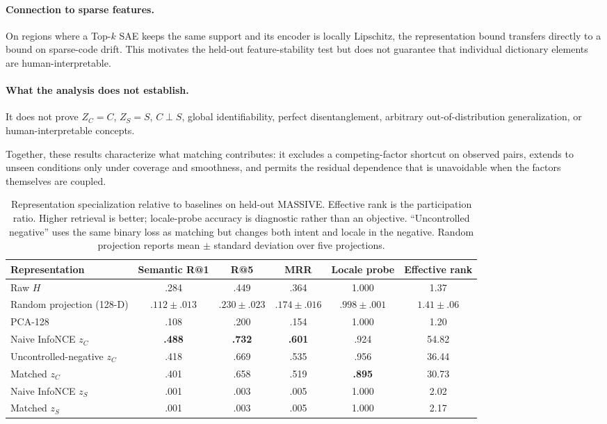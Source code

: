 \documentclass[11pt]{article}
\begin{document}
\paragraph{Connection to sparse features.}
On regions where a Top-$k$ SAE keeps the same support and its encoder is locally Lipschitz, the representation bound transfers directly to a bound on sparse-code drift. This motivates the held-out feature-stability test but does not guarantee that individual dictionary elements are human-interpretable.

\paragraph{What the analysis does not establish.} It does not prove $Z_C=C$, $Z_S=S$, $C\perp S$, global identifiability, perfect disentanglement, arbitrary out-of-distribution generalization, or human-interpretable concepts.

Together, these results characterize what matching contributes: it excludes a competing-factor shortcut on observed pairs, extends to unseen conditions only under coverage and smoothness, and permits the residual dependence that is unavoidable when the factors themselves are coupled.

\begin{table}[!t]
\centering\small
\caption{Representation specialization relative to baselines on held-out MASSIVE. Effective rank is the participation ratio. Higher retrieval is better; locale-probe accuracy is diagnostic rather than an objective. ``Uncontrolled negative'' uses the same binary loss as matching but changes both intent and locale in the negative. Random projection reports mean $\pm$ standard deviation over five projections.}
\label{tab:partition}
\begin{tabular*}{\textwidth}{@{\extracolsep{\fill}}lccccc@{}}
\toprule
Representation & Semantic R@1 & R@5 & MRR & Locale probe & Effective rank \\
\midrule
Raw $H$ & .284 & .449 & .364 & 1.000 & 1.37 \\
Random projection (128-D) & $.112\pm.013$ & $.230\pm.023$ & $.174\pm.016$ & $.998\pm.001$ & $1.41\pm.06$ \\
PCA-128 & .108 & .200 & .154 & 1.000 & 1.20 \\
Naive InfoNCE $z_C$ & \textbf{.488} & \textbf{.732} & \textbf{.601} & .924 & 54.82 \\
Uncontrolled-negative $z_C$ & .418 & .669 & .535 & .956 & 36.44 \\
Matched $z_C$ & .401 & .658 & .519 & \textbf{.895} & 30.73 \\
Naive InfoNCE $z_S$ & .001 & .003 & .005 & 1.000 & 2.02 \\
Matched $z_S$ & .001 & .003 & .005 & 1.000 & 2.17 \\
\bottomrule
\end{tabular*}
\end{table}
\end{document}
